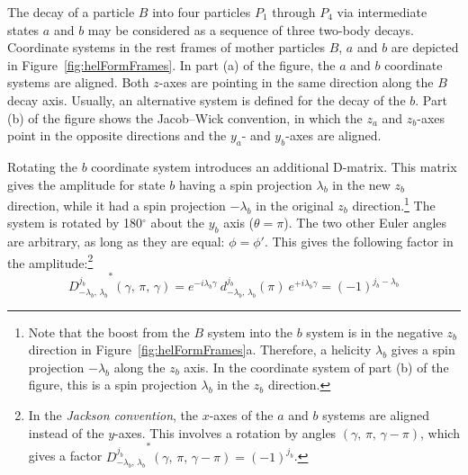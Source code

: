 The decay of a particle $B$ into four particles $P_1$ through $P_4$ via intermediate states $a$ and
$b$ may be considered as a sequence of three two-body decays. Coordinate systems in the rest
frames of mother particles $B$, $a$ and $b$ are depicted in Figure~\ref{fig:helFormFrames}. In
part (a) of the figure, the $a$ and $b$ coordinate systems are aligned. Both $z$-axes are pointing
in the same direction along the $B$ decay axis. Usually, an alternative system is defined for the
decay of the $b$. Part (b) of the figure shows the Jacob--Wick convention, in which the
$z_a$ and $z_b$-axes point in the opposite directions and the $y_a$- and $y_b$-axes are aligned.

Rotating the $b$ coordinate system introduces an additional D-matrix. This matrix gives the
amplitude for state $b$ having a spin projection $\lambda_b$ in the new $z_b$ direction, while it
had a spin projection $-\lambda_b$ in the original $z_b$ direction.\footnote{Note that the boost
from the $B$ system into the $b$ system is in the negative $z_b$ direction in
Figure~\ref{fig:helFormFrames}a. Therefore, a helicity $\lambda_b$ gives a spin projection
$-\lambda_b$ along the $z_b$ axis. In the coordinate system of part (b) of the figure, this is a
spin projection $\lambda_b$ in the $z_b$ direction.} The system is rotated by 180$^\circ$ about
the $y_b$ axis ($\theta=\pi$). The two other Euler angles are arbitrary, as long as they are equal:
$\phi=\phi'$. This gives the following factor in the amplitude:\footnote{In the
\emph{Jackson convention}, the $x$-axes of the $a$ and $b$ systems are aligned instead of the
$y$-axes. This involves a rotation by angles $(\gamma,\,\pi,\,\gamma-\pi)$, which gives a factor
${D_{-\lambda_b,\,\lambda_b}^{j_b}}^*(\gamma,\,\pi,\,\gamma-\pi)=(-1)^{j_b}$.}
\begin{equation}
  {D_{-\lambda_b,\,\lambda_b}^{j_b}}^*(\gamma,\,\pi,\,\gamma)
    = e^{-i\lambda_b\gamma}\ d_{-\lambda_b,\,\lambda_b}^{j_b}(\pi)\ e^{+i\lambda_b\gamma}
    = (-1)^{j_b-\lambda_b}
\end{equation}

